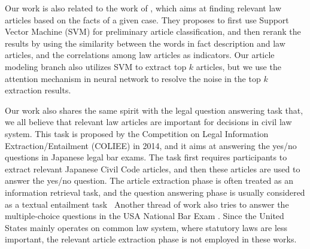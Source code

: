 
Our work is also related to the work of \cite{liu2015predicting}, which aims at finding relevant law articles based on the facts of a given case. They proposes to first use Support Vector Machine (SVM) for preliminary article classification, and then 
rerank the results by using the similarity between the words in fact description and law articles, and the correlations among law articles as indicators.
Our article modeling branch also utilizes SVM to extract top $k$ articles, but we use the attention mechanism in neural network to resolve the noise in the top $k$ extraction results.

Our work also shares the same spirit with the legal question answering task that, we all believe that relevant law articles are important for decisions in civil law system. This task is proposed by the Competition on Legal Information Extraction/Entailment (COLIEE) in 2014,
and it aims at answering the yes/no questions in Japanese legal bar exams. The task first requires participants to extract relevant Japanese Civil Code articles, and then these articles are used to answer the yes/no question. 
The article extraction phase is often treated as an information retrieval task, and the question answering phase is usually considered as a textual entailment task~\cite{kim2014legal,kimconvolutional}
Another thread of work also tries to answer the multiple-choice questions in the USA National Bar Exam \cite{FAWEI16,adebayoneural}. Since the United States mainly operates on common law system, where statutory laws are less important, the relevant article extraction phase is not employed in these works.